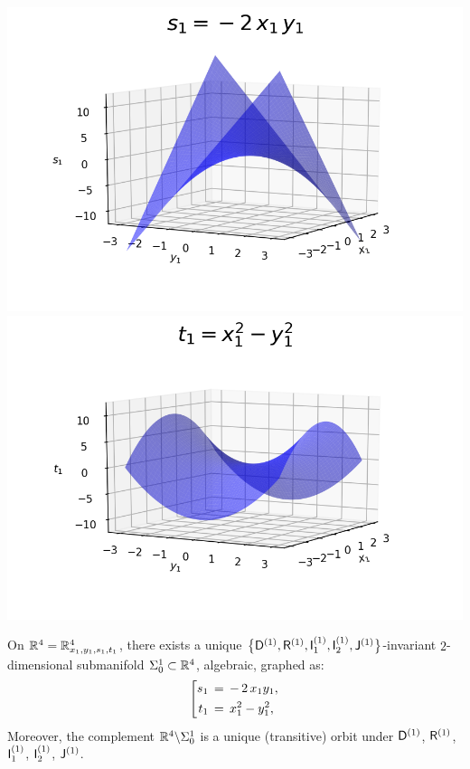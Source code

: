 \documentclass[12pt,twoside,leqno,openany]{amsart}
\begin{document}
\begin{center}
\includegraphics[scale=0.50]{jm1.png}
\!\!\!\!\!\!\!\!\!\!
\includegraphics[scale=0.50]{jm2.png}
\end{center}

\begin{Observation}
\label{Obs-Sigma-0-jets-1}
On $\mathbb{R}^4 = \mathbb{R}_{x_1, y_1, s_1, t_1}^4$, 
there exists a unique 
$\big\{ {\sf D}^{(1)}, {\sf R}^{(1)},
{\sf I}_1^{(1)}, {\sf I}_2^{(1)}, {\sf J}^{(1)} 
\big\}$-invariant $2$-dimensional submanifold
$\Sigma_0^1 \subset \mathbb{R}^4$, algebraic, graphed as:
\[
\left[
\aligned
s_1
&
\,=\,
-\,2\,x_1y_1,
\\
t_1
&
\,=\,
x_1^2-y_1^2,
\endaligned\right.
\]
Moreover, the complement $\mathbb{R}^4 \backslash \Sigma_0^1$ is a unique
(transitive)
orbit under ${\sf D}^{(1)}$, ${\sf R}^{(1)}$,
${\sf I}_1^{(1)}$, ${\sf I}_2^{(1)}$, ${\sf J}^{(1)}$.
\end{Observation}
\end{document}
